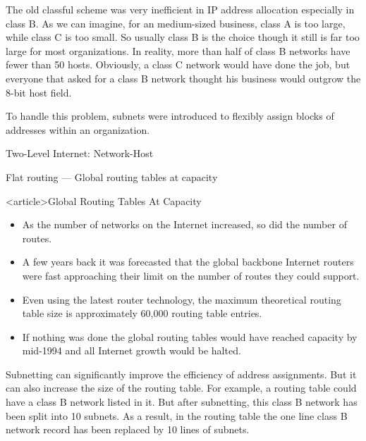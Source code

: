 The old classful scheme was very inefficient in IP address allocation especially in class
B. As we can imagine, for an medium-sized business, class A is too large, while class C is
too small. So usually class B is the choice though it still is far too large for most
organizations. In reality, more than half of class B networks have fewer than 50
hosts. Obviously, a class C network would have done the job, but everyone that asked for a
class B network thought his business would outgrow the 8-bit host field.

To handle this problem, subnets were introduced to flexibly assign blocks of addresses within an
organization.

\begin{frame}{Two-Level Internet: Network-Host}
  \begin{iblock}{Flat routing --- Global routing tables at capacity}
    \centering%
    \mode<beamer>{\texttt{[image: 2-level-internet]}}%
  \end{iblock}
\end{frame}

\begin{frame}<article>{Global Routing Tables At Capacity}
  \begin{itemize}
  \item As the number of networks on the Internet increased, so did the number of routes.
  \item A few years back it was forecasted that the global backbone Internet routers were
    fast approaching their limit on the number of routes they could support.
  \item Even using the latest router technology, the maximum theoretical routing table
    size is approximately 60,000 routing table entries.
  \item If nothing was done the global routing tables would have reached capacity by
    mid-1994 and all Internet growth would be halted.
  \end{itemize}
\end{frame}

Subnetting can significantly improve the efficiency of address assignments. But it can
also increase the size of the routing table. For example, a routing table could have a
class B network listed in it. But after subnetting, this class B network has been split
into 10 subnets. As a result, in the routing table the one line class B network record has
been replaced by 10 lines of subnets.

